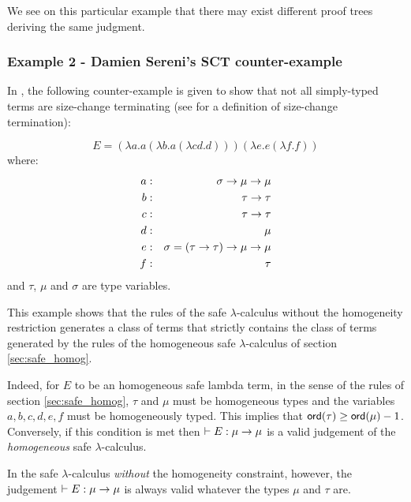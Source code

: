 We see on this particular example that there may exist different
proof trees deriving the same judgment.

\subsubsection{Example 2 - Damien Sereni's SCT counter-example}
In \cite{serenistypesct05}, the following counter-example is given
to show that not all simply-typed terms are size-change terminating
(see \cite{jones01} for a definition of size-change termination):

$$ E =  (\lambda a . a (\lambda b . a (\lambda c d .d))) (\lambda e . e (\lambda f .f))$$
where:
\begin{eqnarray*}
a &:& \sigma \rightarrow \mu \rightarrow \mu \\
b &:& \tau \rightarrow \tau \\
c &:& \tau \rightarrow \tau \\
d &:& \mu \\
e &:& \sigma = (\tau \rightarrow \tau) \rightarrow \mu \rightarrow \mu \\
f &:& \tau
\end{eqnarray*}
and $\tau$, $\mu$ and $\sigma$ are type variables.

This example shows that the rules of the safe $\lambda$-calculus
without the homogeneity restriction generates a class of terms that
strictly contains the class of terms generated by the rules of the
homogeneous safe $\lambda$-calculus of section \ref{sec:safe_homog}.

Indeed, for $E$ to be an homogeneous safe lambda term, in the sense
of the rules of section \ref{sec:safe_homog}, $\tau$ and $\mu$ must
be homogeneous types and the variables $a,b,c,d,e,f$ must be
homogeneously typed. This implies that $ {\sf ord}(\tau) \geq
{\sf ord}(\mu)-1$. Conversely, if this condition is met then $\vdash E :
\mu \rightarrow \mu$ is a valid judgement of the \emph{homogeneous} safe $\lambda$-calculus.

In the safe $\lambda$-calculus \emph{without} the homogeneity
constraint, however, the judgement $\vdash E : \mu \rightarrow \mu$ is
always valid whatever the types $\mu$ and $\tau$ are.
